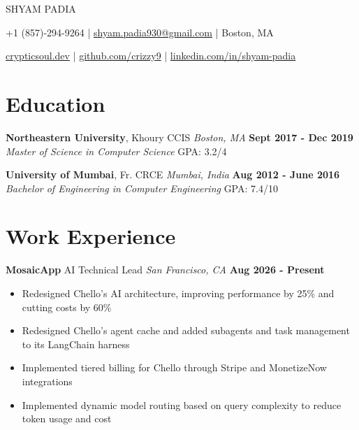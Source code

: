 \documentclass[10pt, letterpaper]{article}
\newcommand{\name}[1]{\centerline{\Large \scshape {#1}}}
\newcommand{\contactinfo}[1]{\centerline{\small #1}}
\newcommand{\educationentry}[4]{
  \noindent\textbf{#1}, #2 \hfill \textit{#3} \hfill \textbf{#4}
}
\newcommand{\jobentry}[4]{
  \noindent\textbf{#1} \hfill #2 \hfill \textit{#3} \hfill \textbf{#4}
}
\begin{document}
\name{SHYAM PADIA}
\contactinfo{
	+1 (857)-294-9264 |
	\href{mailto:shyam.padia930@gmail.com}{shyam.padia930@gmail.com} |
	Boston, MA
}
\contactinfo{
	\href{https://crypticsoul.dev}{crypticsoul.dev} |
	\href{https://github.com/crizzy9}{github.com/crizzy9} |
	\href{https://linkedin.com/in/shyam-padia}{linkedin.com/in/shyam-padia}
}

\section{Education}

\educationentry{Northeastern University}{Khoury CCIS}{Boston, MA}{Sept 2017 - Dec 2019}\\
\textit{Master of Science in Computer Science} \hfill GPA: 3.2/4


\educationentry{University of Mumbai}{Fr. CRCE}{Mumbai, India}{Aug 2012 - June 2016}\\
\textit{Bachelor of Engineering in Computer Engineering} \hfill GPA: 7.4/10

\section{Work Experience}

\jobentry{MosaicApp}{AI Technical Lead}{San Francisco, CA}{Aug 2026 - Present}
\begin{itemize}
	\item Redesigned Chello's AI architecture, improving performance by 25\% and cutting costs by 60\%
	\item Redesigned Chello's agent cache and added subagents and task management to its LangChain harness
	\item Implemented tiered billing for Chello through Stripe and MonetizeNow integrations
	\item Implemented dynamic model routing based on query complexity to reduce token usage and cost
\end{itemize}
\end{document}
